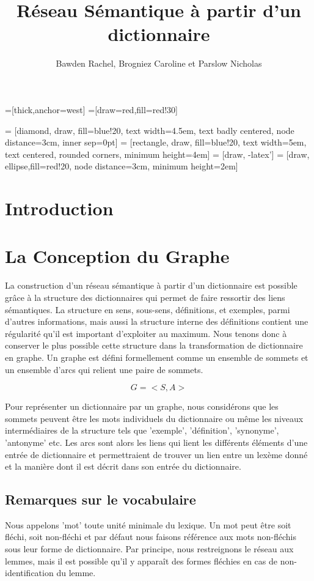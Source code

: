 \documentclass[a4paper, 12pt]{article}
\title{Réseau Sémantique à partir d'un dictionnaire}
\author{Bawden Rachel, Brogniez Caroline et Parslow Nicholas}
\date{}
\begin{document}
=[thick,anchor=west]
=[draw=red,fill=red!30]

 = [diamond, draw, fill=blue!20, 
    text width=4.5em, text badly centered, node distance=3cm, inner sep=0pt]
 = [rectangle, draw, fill=blue!20, 
    text width=5em, text centered, rounded corners, minimum height=4em]
 = [draw, -latex']
 = [draw, ellipse,fill=red!20, node distance=3cm,
    minimum height=2em]

\maketitle

\section{Introduction}


\section{La Conception du Graphe}

La construction d'un réseau sémantique à partir d'un dictionnaire est possible grâce à la structure des dictionnaires qui permet de faire ressortir des liens sémantiques. La structure en sens, sous-sens, définitions, et exemples, parmi d'autres informations, mais aussi la structure interne des définitions contient une régularité qu'il est important d'exploiter au maximum. Nous tenons donc à conserver le plus possible cette structure dans la transformation de dictionnaire en graphe. 
Un graphe est défini formellement comme un ensemble de sommets et un ensemble d'arcs qui relient une paire de sommets.

\[
G = <S, A>
\]

Pour représenter un dictionnaire par un graphe, nous considérons que les sommets peuvent être les mots individuels du dictionnaire ou même les niveaux intermédiaires de la structure tels que 'exemple', 'définition', 'synonyme', 'antonyme' etc. Les arcs sont alors les liens qui lient les différents éléments d'une entrée de dictionnaire et permettraient de trouver un lien entre un lexème donné et la manière dont il est décrit dans son entrée du dictionnaire.

\subsection{Remarques sur le vocabulaire}
Nous appelons 'mot' toute unité minimale du lexique. Un mot peut être soit fléchi, soit non-fléchi et par défaut nous faisons référence aux mots non-fléchis sous leur forme de dictionnaire. Par principe, nous restreignons le réseau aux lemmes, mais il est possible qu'il y apparaît des formes fléchies en cas de non-identification du lemme.
\end{document}
